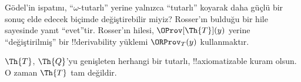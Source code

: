 



G\"odel'in ispatını, ``$\omega$-tutarlı'' yerine yalnızca ``tutarlı''
koyarak daha güçlü bir sonuç elde edecek biçimde değiştirebilir miyiz?
Rosser'ın bulduğu bir hile sayesinde yanıt ``evet''tir. Rosser'ın hilesi,
$\OProv[\Th{T}](y)$ yerine ``değiştirilmiş'' bir !!{derivability} yüklemi
$\ORProv_T(y)$ kullanmaktır.

\begin{thm}
$\Th{T}$, $\Th{Q}$'yu genişleten herhangi bir tutarlı, !!{axiomatizable}
kuram olsun. O zaman $\Th{T}$ tam değildir.
\end{thm}

